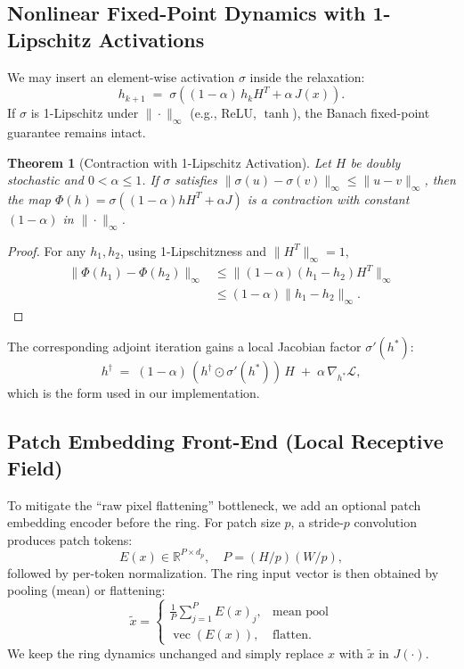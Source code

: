 \documentclass[11pt,a4paper]{article}
\newtheorem{theorem}{Theorem}[section]
\newcommand{\LL}{\mathcal{L}}
\begin{document}
\subsection{Nonlinear Fixed-Point Dynamics with 1-Lipschitz Activations}
\label{sec:ext_nonlinear}

We may insert an element-wise activation $\sigma$ inside the relaxation:
\begin{equation}
h_{k+1} \;=\; \sigma\!\left((1-\alpha)\,h_k H^T + \alpha\,J(x)\right).
\end{equation}
If $\sigma$ is 1-Lipschitz under $\|\cdot\|_\infty$ (e.g., ReLU, $\tanh$), the Banach fixed-point guarantee remains intact.

\begin{theorem}[Contraction with 1-Lipschitz Activation]
Let $H$ be doubly stochastic and $0<\alpha\le 1$. If $\sigma$ satisfies $\|\sigma(u)-\sigma(v)\|_\infty\le \|u-v\|_\infty$, then the map
$\Phi(h)=\sigma((1-\alpha)hH^T+\alpha J)$ is a contraction with constant $(1-\alpha)$ in $\|\cdot\|_\infty$.
\end{theorem}

\begin{proof}
For any $h_1,h_2$, using 1-Lipschitzness and $\|H^T\|_\infty=1$,
\begin{align}
\|\Phi(h_1)-\Phi(h_2)\|_\infty
&\le \|(1-\alpha)(h_1-h_2)H^T\|_\infty \\
&\le (1-\alpha)\|h_1-h_2\|_\infty.
\end{align}
\end{proof}

The corresponding adjoint iteration gains a local Jacobian factor $\sigma'(h^*)$:
\begin{equation}
h^\dagger \;=\; (1-\alpha)\,(h^\dagger \odot \sigma'(h^*))\,H \;+\; \alpha\,\nabla_{h^*}\LL,
\end{equation}
which is the form used in our implementation.

\subsection{Patch Embedding Front-End (Local Receptive Field)}
\label{sec:ext_patch}

To mitigate the ``raw pixel flattening'' bottleneck, we add an optional patch embedding encoder before the ring. For patch size $p$, a stride-$p$ convolution produces patch tokens:
\begin{equation}
E(x) \in \mathbb{R}^{P\times d_p},\quad P=(H/p)(W/p),
\end{equation}
followed by per-token normalization. The ring input vector is then obtained by pooling (mean) or flattening:
\begin{equation}
\tilde{x} =
\begin{cases}
\frac{1}{P}\sum_{j=1}^P E(x)_j, & \text{mean pool}\\
\operatorname{vec}(E(x)), & \text{flatten.}
\end{cases}
\end{equation}
We keep the ring dynamics unchanged and simply replace $x$ with $\tilde{x}$ in $J(\cdot)$.
\end{document}
